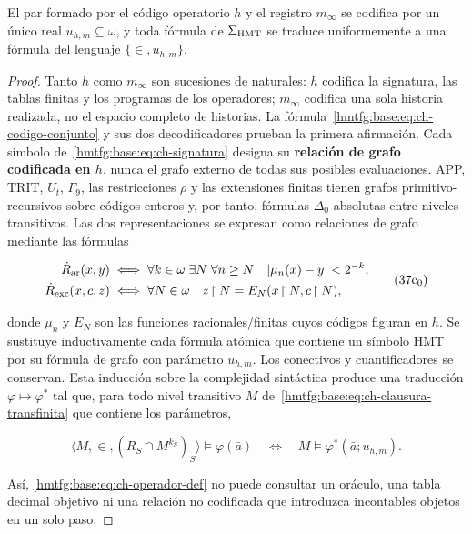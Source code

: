 \begin{lemma}
\label{hmtfg:base:thm:ch-6}
El par formado por
el código operatorio \(h\) y el registro \(m_\infty\) se codifica por un único
real \(u_{h,m}\subseteq\omega\), y toda fórmula de \(\Sigma_{\rm HMT}\) se
traduce uniformemente a una fórmula del lenguaje \(\{\in,u_{h,m}\}\).

\end{lemma}
\begin{proof}
Tanto \(h\) como \(m_\infty\) son sucesiones de naturales: \(h\)
codifica la signatura, las tablas finitas y los programas de los operadores;
\(m_\infty\) codifica una sola historia realizada, no el espacio completo de
historias. La fórmula~\eqref{hmtfg:base:eq:ch-codigo-conjunto} y sus dos decodificadores prueban la primera
afirmación. Cada símbolo de~\eqref{hmtfg:base:eq:ch-signatura} designa su \textbf{relación de grafo codificada en \(h\)}, nunca el grafo externo de todas sus posibles evaluaciones. APP,
TRIT, \(U_t\), \(\Gamma_9\), las restricciones \(\rho\) y las extensiones
finitas tienen grafos primitivo-recursivos sobre códigos enteros y, por tanto,
fórmulas \(\Delta_0\) absolutas entre niveles transitivos. Las dos
representaciones se expresan como relaciones de grafo mediante las fórmulas

\[
 \begin{aligned}
 \dot R_{\rm ar}(x,y)
 &\;\Longleftrightarrow\;
 \forall k\in\omega\;\exists N\;\forall n\ge N\quad
 |\mu_n(x)-y|<2^{-k},\\
 \dot R_{\rm exc}(x,c,z)
 &\;\Longleftrightarrow\;
 \forall N\in\omega\quad z\!\upharpoonright N
   =E_N(x\!\upharpoonright N,c\!\upharpoonright N),
 \end{aligned}
\tag{37c$_0$}\label{hmtfg:base:eq:ch-grafos-publicacion}
\]

donde \(\mu_n\) y \(E_N\) son las funciones racionales/finitas cuyos códigos
figuran en \(h\). Se sustituye inductivamente cada fórmula atómica que contiene
un símbolo HMT por su fórmula de grafo con parámetro \(u_{h,m}\). Los
conectivos y cuantificadores se conservan. Esta inducción sobre la complejidad
sintáctica produce una traducción \(\varphi\mapsto\varphi^*\) tal que, para
todo nivel transitivo \(M\) de~\eqref{hmtfg:base:eq:ch-clausura-transfinita} que contiene los parámetros,

\[
 \langle M,\in,(\dot R_S\cap M^{k_S})_S\rangle
   \models\varphi(\bar a)
 \quad\Longleftrightarrow\quad
 M\models\varphi^*(\bar a;u_{h,m}).
\tag{37c}\label{hmtfg:base:eq:ch-eliminacion-uniforme}
\]

Así, \eqref{hmtfg:base:eq:ch-operador-def} no puede consultar un oráculo, una tabla decimal objetivo ni una
relación no codificada que introduzca incontables objetos en un solo paso.
\end{proof}

